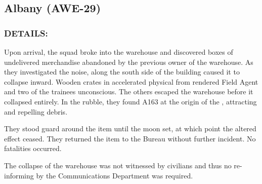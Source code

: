 \subsection*{Albany (AWE-29)}
\subsubsection*{DETAILS:}
\par Upon arrival, the squad broke into the warehouse and discovered
boxes of undelivered merchandise abandoned by the previous
owner of the warehouse. As they investigated the noise,  along the south side of the building caused it to collapse inward. Wooden crates in accelerated
physical  from  rendered Field Agent  and two of the trainees unconscious. The others escaped the warehouse before it collapsed entirely. In the rubble, they found A163 at the origin of the , attracting and repelling debris.
\par They stood guard around the item until the moon set, at which
point the altered effect ceased. They returned the item to the
Bureau without further incident. No fatalities occurred.
\par The collapse of the warehouse was not witnessed by civilians and thus no re-informing by the Communications Department was
required.